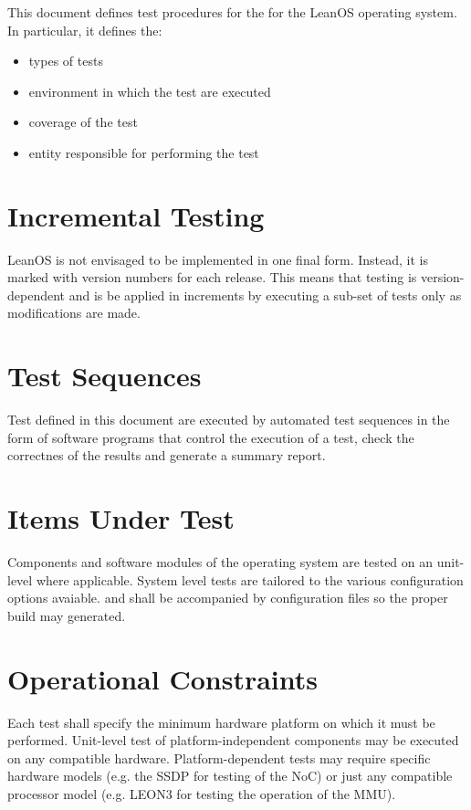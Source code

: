 This document defines test procedures for the for the LeanOS operating system.
In particular, it defines the:
\begin{itemize}
	\item types of tests
	\item environment in which the test are executed
	\item coverage of the test
	\item entity responsible for performing the test
\end{itemize}


\section{Incremental Testing}

LeanOS is not envisaged to be implemented in one final form. Instead, it is
marked with version numbers for each release. This means that testing is
version-dependent and is be applied in increments by executing a sub-set of
tests only as modifications are made.


\section{Test Sequences}

Test defined in this document are executed by automated test sequences in the
form of software programs that control the execution of a test, check the
correctnes of the results and generate a summary report.


\section{Items Under Test}

Components and software modules of the operating system are tested on an
unit-level where applicable. System level tests are tailored to the
various configuration options avaiable. and shall be accompanied by
configuration files so the proper build may generated.


\section{Operational Constraints}

Each test shall specify the minimum hardware platform on which it must be
performed. Unit-level test of platform-independent components may be executed
on any compatible hardware. Platform-dependent tests may require specific
hardware models (e.g. the \gls{SSDP} for testing of the \gls{NoC}) or just any
compatible processor model (e.g. \gls{LEON3} for testing the operation of the
\gls{MMU}).




